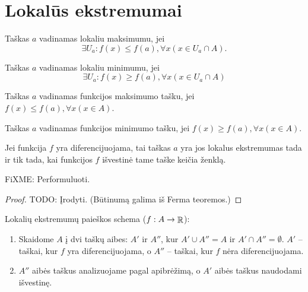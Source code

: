 \section{Lokalūs ekstremumai}

\begin{defn}
  Taškas $a$ vadinamas lokaliu maksimumu, jei
  \begin{equation*}
    \exists U_{a} : f(x) \leq f(a), \forall x (x \in U_{a} \cap A).
  \end{equation*}
\end{defn}

\begin{defn}
  Taškas $a$ vadinamas lokaliu minimumu, jei
  \begin{equation*}
    \exists U_{a} : f(x) \geq f(a), \forall x (x \in U_{a} \cap A)
  \end{equation*}
\end{defn}

\begin{defn}
  Taškas $a$ vadinamas funkcijos maksimumo tašku, jei 
  $f(x) \leq f(a), \forall x (x \in A)$.
\end{defn}

\begin{defn}
  Taškas $a$ vadinamas funkcijos minimumo tašku, jei
  $f(x) \geq f(a), \forall x (x \in A)$.
\end{defn}

\begin{prop}
  Jei funkcija $f$ yra diferencijuojama, tai taškas $a$ yra jos
  lokalus ekstremumas tada ir tik tada, kai funkcijos $f$ išvestinė
  tame taške keičia ženklą.

  FiXME: Performuluoti.
  \begin{proof}
    TODO: Įrodyti. (Būtinumą galima iš Ferma teoremos.)
  \end{proof}
\end{prop}

Lokalių ekstremumų paieškos schema ($f : A \to \mathop{\mathbb{R}}$):
\begin{enumerate}
  \item Skaidome $A$ į dvi taškų aibes: $A'$ ir $A''$, kur
    $A' \cup A'' = A$ ir
    $A' \cap A'' = \emptyset$.
    $A'$ – taškai, kur $f$ yra diferencijuojama, o 
    $A''$ – taškai, kur $f$ nėra diferencijuojama.
  \item $A''$ aibės taškus analizuojame pagal apibrėžimą, o 
    $A'$ aibės taškus naudodami išvestinę.
\end{enumerate}
